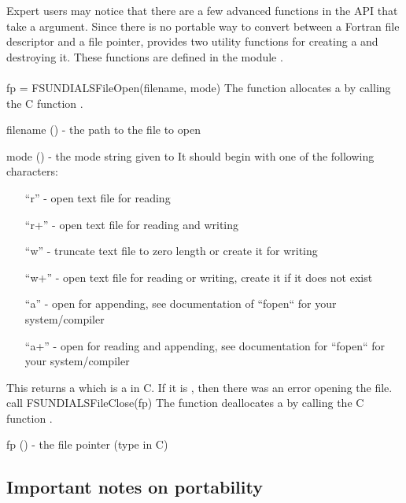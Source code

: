 Expert {\sundials} users may notice that there are a few advanced functions in the {\sundials}
{\CC} API that take a  argument. Since there is no portable way to convert between
a Fortran file descriptor and a {\CC} file pointer, {\sundials} provides two utility functions
for creating a  and destroying it. These functions are defined in the module
.
\\
\\
{
  fp = FSUNDIALSFileOpen(filename, mode)
}
{
  The function allocates a  by calling the C function .
}
{
  \begin{args}[filename]
  \item[filename] () - the path to the file to open
  \item[mode] () - the mode string given to 
    It should begin with one of the following characters: 
    \begin{itemize}
      \item[] ``r'' - open text file for reading
      \item[] ``r+'' - open text file for reading and writing
      \item[] ``w''  - truncate text file to zero length or create it for writing
      \item[] ``w+'' - open text file for reading or writing, create it if it does not exist
      \item[] ``a''  - open for appending, see documentation of ``fopen`` for your system/compiler
      \item[] ``a+'' - open for reading and appending, see documentation for ``fopen`` for your system/compiler
    \end{itemize}
  \end{args}
}
{
  This returns a  which is a  in C.
  If it is , then there was an error opening the file.
}
{}
%
{
  call FSUNDIALSFileClose(fp)
}
{
  The function deallocates a  by calling the C function .
}
{
  \begin{args}[fp]
  \item[fp] () - the file pointer (type  in C)
  \end{args}
}
{}
{}

\subsection{Important notes on portability}\label{ss:f2003_portability}

